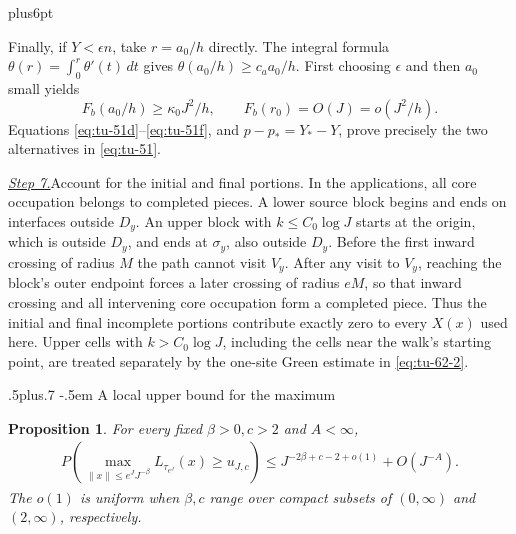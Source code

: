 \documentclass[12pt,reqno]{amsart}
\makeatletter
\def\subsection{\@startsection{subsection}{2}{0pt}%
  {.5\linespacing plus.7\linespacing}
  {-.5em}
  {\normalfont\scshape}}
\theoremstyle{plain}
\newtheorem{proposition}[theorem]{Proposition}
\theoremstyle{definition}
\theoremstyle{remark}
\renewenvironment{proof}[1][\proofname]{%
  \par
  \pushQED{\qed}%
  \normalfont
  \topsep6pt plus6pt\relax
  \trivlist
  \item[\hskip\labelsep\slshape #1\@addpunct{.}]%
  \ignorespaces
}{%
  \popQED
  \endtrivlist
  \@endpefalse
}
\DeclareRobustCommand{\qed}{%
  \leavevmode\unskip\penalty9999\hbox{}\nobreak
  \ifmmode
    \makebox[0pt][l]{\qquad\hbox{\qedsymbol}}%
  \else
    \qquad\hbox{\qedsymbol}%
  \fi
}
\renewcommand{\qedsymbol}{\rule[.47pt]{4pt}{6pt}}
\numberwithin{equation}{section}
\makeatother
\begin{document}
\begin{proof}[Proof of Lemma~\ref{lem:terminal-feynman-kac}]
Finally, if \(Y<\epsilon n\), take \(r=a_0/h\) directly.  The integral
formula \(\theta(r)=\int_0^r\theta'(t)\,dt\) gives
\(\theta(a_0/h)\ge c_aa_0/h\).  First choosing \(\epsilon\) and then
\(a_0\) small yields
\begin{equation}
       F_b(a_0/h)\ge\kappa_0J^2/h,
       \qquad F_b(r_0)=O(J)=o(J^2/h).                        \label{eq:tu-51f}
\end{equation}
Equations \eqref{eq:tu-51d}--\eqref{eq:tu-51f}, and
\(p-p_*=Y_*-Y\), prove precisely the two alternatives in \eqref{eq:tu-51}.

\smallskip\noindent
\underline{\textit{Step 7.}}\quad Account for the initial and final portions.
In the applications, all core occupation belongs to completed pieces.  A lower source block begins and ends on interfaces outside
\(D_y\).  An upper block with \(k\le C_0\log J\) starts at the origin,
which is outside \(D_y\), and ends at \(\sigma_y\), also outside
\(D_y\).  Before the first inward crossing of radius \(M\) the path
cannot visit \(V_y\).  After any visit to \(V_y\), reaching the block's
outer endpoint forces a later crossing of radius \(eM\), so that inward
crossing and all intervening core occupation form a completed piece.
Thus the initial and final incomplete portions contribute exactly zero
to every \(X(x)\) used here.  Upper cells with \(k>C_0\log J\), including
the cells near the walk's starting point, are treated separately by the
one-site Green estimate in \eqref{eq:tu-62-2}.
\end{proof}

\subsection{A local upper bound for the maximum}
\begin{proposition}\label{prop:localized-disk-upper}
For every fixed \(\beta>0,c>2\) and \(A<\infty\),
\begin{equation}
\begin{split}
 P\left(\max_{\lVert x\rVert\le e^JJ^{-\beta}}
             L_{\tau_{e^J}}(x)\ge u_{J,c}\right)
 \le J^{-2\beta+c-2+o(1)}+O(J^{-A}).                         \end{split}
\label{eq:tu-53}
\end{equation}
The \(o(1)\) is uniform when \(\beta,c\) range over compact subsets of
\((0,\infty)\) and \((2,\infty)\), respectively.
\end{proposition}
\end{document}
